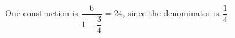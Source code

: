 One construction is $\boxed{\dfrac{6}{1-\dfrac{3}{4}}=24}$, since the denominator is $\dfrac{1}{4}$.

